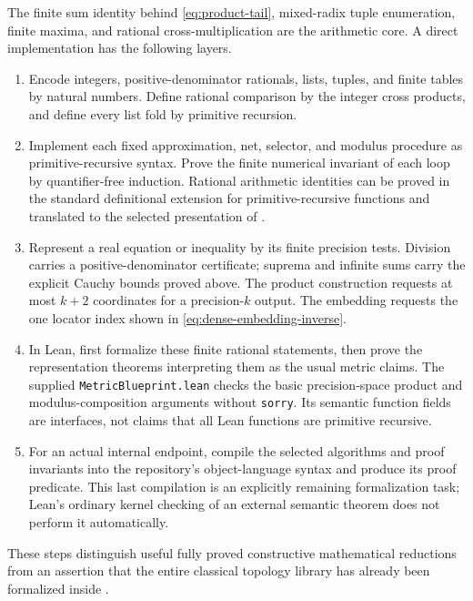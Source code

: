 The finite sum identity behind \eqref{eq:product-tail}, mixed-radix tuple
enumeration, finite maxima, and rational cross-multiplication are the
arithmetic core.  A direct implementation has the following layers.
\begin{enumerate}
\item Encode integers, positive-denominator rationals, lists, tuples, and
finite tables by natural numbers.  Define rational comparison by the
integer cross products, and define every list fold by primitive recursion.
\item Implement each fixed approximation, net, selector, and modulus
procedure as primitive-recursive syntax.  Prove the finite numerical
invariant of each loop by quantifier-free induction.  Rational arithmetic
identities can be proved in the standard definitional extension for
primitive-recursive functions and translated to the selected presentation
of \ipra.
\item Represent a real equation or inequality by its finite precision
tests.  Division carries a positive-denominator certificate; suprema and
infinite sums carry the explicit Cauchy bounds proved above.  The
product construction requests at most $k+2$ coordinates for a
precision-$k$ output.  The embedding requests the one locator index
shown in \eqref{eq:dense-embedding-inverse}.
\item In Lean, first formalize these finite rational statements, then
prove the representation theorems interpreting them as the usual metric
claims.  The supplied \texttt{MetricBlueprint.lean} checks the basic
precision-space product and modulus-composition arguments without
\texttt{sorry}.  Its semantic function fields are interfaces, not claims
that all Lean functions are primitive recursive.
\item For an actual internal endpoint, compile the selected algorithms
and proof invariants into the repository's object-language syntax and
produce its proof predicate.  This last compilation is an explicitly
remaining formalization task; Lean's ordinary kernel checking of an
external semantic theorem does not perform it automatically.
\end{enumerate}
These steps distinguish useful fully proved constructive mathematical
reductions from an assertion that the entire classical topology library
has already been formalized inside \ipra.
